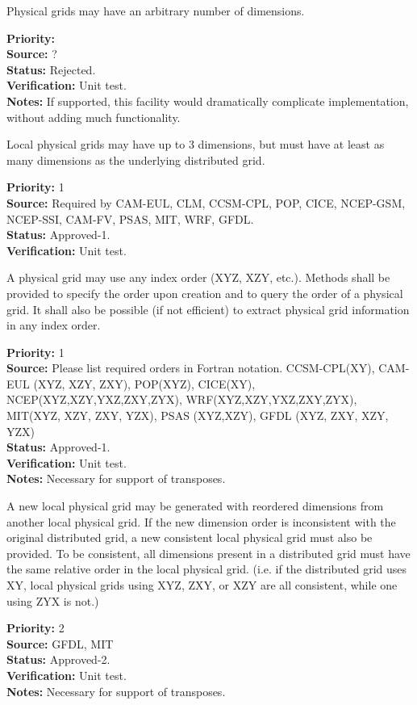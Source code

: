 Physical grids may have an arbitrary number of dimensions. 
\begin{reqlist}
{\bf Priority:} \\
{\bf Source:} ? \\
{\bf Status:} Rejected.\\
{\bf Verification:} Unit test.\\
{\bf Notes:} If supported, this facility would dramatically complicate implementation,
without adding much functionality.
\end{reqlist}

Local physical grids may have up to 3 dimensions, but must have at least as many dimensions as the
underlying distributed grid. 
\begin{reqlist}
{\bf Priority:}  1\\
{\bf Source:} Required by CAM-EUL, CLM, CCSM-CPL, POP, CICE, NCEP-GSM, NCEP-SSI,
              CAM-FV, PSAS, MIT, WRF, GFDL. \\
{\bf Status:} Approved-1. \\
{\bf Verification:} Unit test.\\
\end{reqlist}

A physical grid may use any index order (XYZ, XZY, etc.).  Methods shall be provided to
specify the order upon creation and to query the order of a physical grid.  It shall
also be possible (if not efficient) to extract physical grid information in any index
order.
\begin{reqlist}
{\bf Priority:}  1 \\
{\bf Source:} Please list required orders in Fortran notation. CCSM-CPL(XY), 
CAM-EUL (XYZ, XZY, ZXY), POP(XYZ), CICE(XY), NCEP(XYZ,XZY,YXZ,ZXY,ZYX), 
WRF(XYZ,XZY,YXZ,ZXY,ZYX),
MIT(XYZ, XZY, ZXY, YZX),
PSAS (XYZ,XZY), GFDL (XYZ, ZXY, XZY, YZX) \\
{\bf Status:} Approved-1. \\
{\bf Verification:} Unit test.\\
{\bf Notes:} Necessary for support of transposes.
\end{reqlist}

A new local physical grid may be generated with reordered dimensions from another local physical grid.
If the new dimension order is inconsistent with the original distributed grid, a new
consistent local physical grid must also be provided.  To be consistent, all dimensions present
in a distributed grid must have the same relative order in the local physical grid.  (i.e. if the
distributed grid uses XY, local physical grids using XYZ, ZXY, or XZY are all consistent, while one using
ZYX is not.)
\begin{reqlist}
{\bf Priority:} 2\\
{\bf Source:} GFDL, MIT\\
{\bf Status:} Approved-2. \\
{\bf Verification:} Unit test.\\
{\bf Notes:} Necessary for support of transposes.
\end{reqlist}

